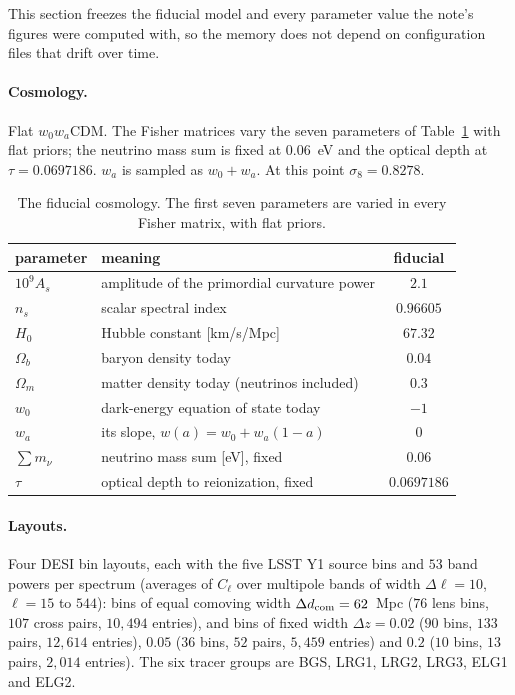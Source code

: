 \documentclass[11pt]{article}
\begin{document}
This section freezes the fiducial model and every parameter value the
note's figures were computed with, so the memory does not depend on
configuration files that drift over time.

\paragraph{Cosmology.}
Flat $w_0 w_a$CDM.  The Fisher matrices vary the seven parameters of
Table~\ref{tab:cosmology} with flat priors; the neutrino mass sum is
fixed at $0.06$~eV and the optical depth at $\tau = 0.0697186$.  $w_a$
is sampled as $w_0 + w_a$.  At this point $\sigma_8 = 0.8278$.

\begin{table}[tbp]
  \centering
  \begin{tabular}{llc}
    \hline
    parameter & meaning & fiducial \\
    \hline
    $10^9 A_s$ & amplitude of the primordial curvature power & $2.1$ \\
    $n_s$ & scalar spectral index & $0.96605$ \\
    $H_0$ & Hubble constant [km/s/Mpc] & $67.32$ \\
    $\Omega_b$ & baryon density today & $0.04$ \\
    $\Omega_m$ & matter density today (neutrinos included) & $0.3$ \\
    $w_0$ & dark-energy equation of state today & $-1$ \\
    $w_a$ & its slope, $w(a) = w_0 + w_a (1 - a)$ & $0$ \\
    \hline
    $\sum m_\nu$ & neutrino mass sum [eV], fixed & $0.06$ \\
    $\tau$ & optical depth to reionization, fixed & $0.0697186$ \\
    \hline
  \end{tabular}
  \caption{The fiducial cosmology.  The first seven parameters are
    varied in every Fisher matrix, with flat priors.}
  \label{tab:cosmology}
\end{table}

\paragraph{Layouts.}
Four DESI bin layouts, each with the five LSST Y1 source bins and $53$
band powers per spectrum (averages of $C_\ell$ over multipole bands of
width $\Delta\ell = 10$, $\ell = 15$ to $544$):
bins of equal comoving width $\Delta d_{\rm com} = 62$~Mpc ($76$ lens
bins, $107$ cross pairs, $10{,}494$ entries), and bins of fixed width
$\Delta z = 0.02$ ($90$ bins, $133$ pairs, $12{,}614$ entries), $0.05$
($36$ bins, $52$ pairs, $5{,}459$ entries) and $0.2$ ($10$ bins, $13$
pairs, $2{,}014$ entries).  The six tracer groups are BGS, LRG1, LRG2,
LRG3, ELG1 and ELG2.
\end{document}
